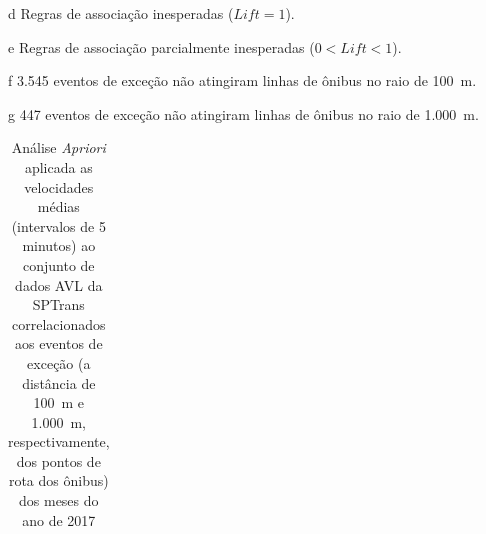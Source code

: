\documentclass[
	12pt,				%
	oneside,			%
	a4paper,			%
	english,			%
	brazil				%
	]{abntex2ppgsi}
\begin{document}
{{{\begin{table}[!htb]
\begin{threeparttable}
\begin{tablenotes}
            \item[d] Regras de associação inesperadas ($Lift = 1$).
            \item[e] Regras de associação parcialmente inesperadas ($0 < Lift < 1$).
            \item[f] 3.545 eventos de exceção não atingiram linhas de ônibus no raio de 100~m.
            \item[g] 447 eventos de exceção não atingiram linhas de ônibus no raio de 1.000~m.
        \end{tablenotes}
\end{threeparttable}
\end{table}

\begin{table}[!htb]
\centering
\begin{threeparttable}
\caption {Análise \textit{Apriori} aplicada as velocidades médias (intervalos de 5 minutos) ao conjunto de dados AVL da SPTrans correlacionados aos eventos de exceção (a distância de 100~m e 1.000~m, respectivamente, dos pontos de rota dos ônibus) dos meses do ano de 2017}
\label {tab:aprioriExceptFullShapes}
\begin{tabular}{c|c|c|c|c|c}
\toprule



\end{tabular}
\end{threeparttable}
\end{table}}}}
\end{document}
